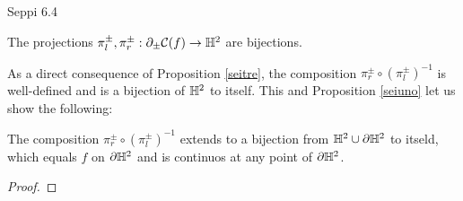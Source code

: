 \begin{observation}
    Seppi 6.4 
\end{observation}

\begin{proposition}\label{seitre}
    The projections $\pi_l^\pm,\pi_r^\pm:\partial_\pm\mathcal{C}(f)\to\mathbb{H}^2$ are bijections. 
\end{proposition}

As a direct consequence of Proposition \ref{seitre}, the composition $\pi_r^\pm\circ(\pi_l^\pm)^{-1}$ is well-defined and is a bijection of $\mathbb{H}^2$ to itself. This and Proposition \ref{seiuno} let us show the following: 

\begin{corollary}
    The composition $\pi_r^\pm\circ(\pi_l^\pm)^{-1}$ extends to a bijection from $\mathbb{H}^2\cup\partial\mathbb{H}^2$ to itseld, which equals $f$ on $\partial\mathbb{H}^2$ and is continuos at any point of $\partial\mathbb{H}^2$.
\end{corollary}
\begin{proof}
    
\end{proof}